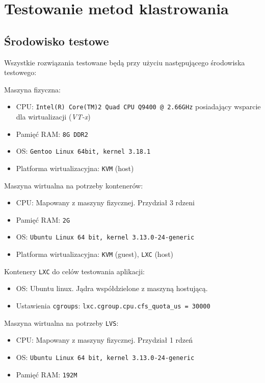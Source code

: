 \chapter{Testowanie metod klastrowania}
\label{ch:testwy}
\section{Środowisko testowe}
Wszystkie rozwiązania testowane będą przy użyciu następującego środowiska testowego:
\begin{description}
\item{Maszyna fizyczna:}
    \begin{itemize}
	\item CPU: \texttt{Intel(R) Core(TM)2 Quad CPU    Q9400 @ 2.66GHz} posiadający wsparcie dla wirtualizacji (\textit{VT-x})
	\item Pamięć RAM: \texttt{8G DDR2}
	\item OS: \texttt{Gentoo Linux 64bit, kernel 3.18.1}
	\item Platforma wirtualizacyjna: \texttt{KVM} (host)
    \end{itemize}
\item{Maszyna wirtualna na potrzeby kontenerów:}
    \begin{itemize}
	\item CPU: Mapowany z maszyny fizycznej. Przydział 3 rdzeni
	\item Pamięć RAM: \texttt{2G}
	\item OS: \texttt{Ubuntu Linux 64 bit, kernel 3.13.0-24-generic}
	\item Platforma wirtualizacyjna: \texttt{KVM} (guest), \texttt{LXC} (host)
    \end{itemize}
\item{Kontenery \texttt{LXC} do celów testowania aplikacji:}
    \begin{itemize}
	\item OS: Ubuntu linux. Jądra współdzielone z maszyną hostującą.
	\item Ustawienia \texttt{cgroups}: \texttt{lxc.cgroup.cpu.cfs\_quota\_us = 30000}
    \end{itemize}
\item{Maszyna wirtualna na potrzeby \texttt{LVS}:}
    \begin{itemize}
	\item CPU: Mapowany z maszyny fizycznej. Przydział 1 rdzeń
	\item OS: \texttt{Ubuntu Linux 64 bit, kernel 3.13.0-24-generic}
	\item Pamięć RAM: \texttt{192M}
    \end{itemize}
\end{description}
